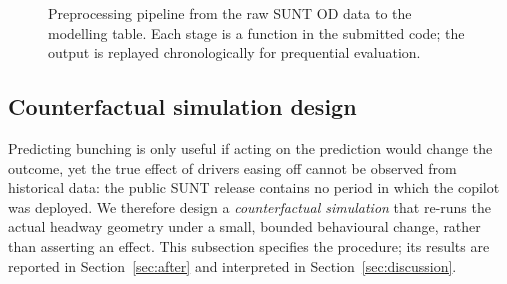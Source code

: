 \documentclass[final,5p,times,twocolumn,authoryear]{elsarticle}
\begin{document}
\begin{figure}[t]
\centering
{}
\caption{Preprocessing pipeline from the raw SUNT OD data to the modelling table. Each stage is a
function in the submitted code; the output is replayed chronologically for prequential evaluation.}
\label{fig:pipeline}
\end{figure}

\subsection{Counterfactual simulation design}
\label{sec:simdesign}

Predicting bunching is only useful if acting on the prediction would change the outcome, yet the
true effect of drivers easing off cannot be observed from historical data: the public SUNT release
contains no period in which the copilot was deployed. We therefore design a \emph{counterfactual
simulation} that re-runs the actual headway geometry under a small, bounded behavioural change,
rather than asserting an effect. This subsection specifies the procedure; its results are reported
in Section~\ref{sec:after} and interpreted in Section~\ref{sec:discussion}.
\end{document}
